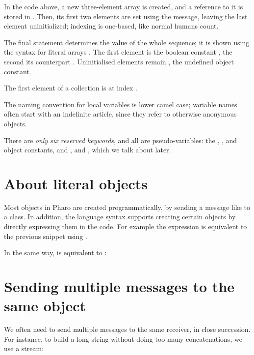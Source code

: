 \documentclass[10pt,twoside,english]{_support/latex/sbabook/sbabook}
\begin{document}
In the code above, a new three-element array is created, and a reference to it is stored in .
Then, its first two elements are set using the  message, leaving the last element uninitialized; indexing is one-based, like normal humans count.

The final statement determines the value of the whole sequence; it is shown using the syntax for literal arrays .
The first element is the boolean constant , the second its counterpart .
Uninitialised elements remain , the undefined object constant.

\begin{coffee}
The first element of a collection is at index .
\end{coffee}

\begin{coffee}
The naming convention for local variables is lower camel case; variable names often start with an indefinite article, since they refer to otherwise anonymous objects.
\end{coffee}

\begin{coffee}
There are \textit{only six reserved keywords}, and all are pseudo-variables: the , , and  object constants, and ,  and , which we talk about later.
\end{coffee}
\section{About literal objects}
Most objects in Pharo are created programmatically, by sending a message like  to a class.
In addition, the language syntax supports creating certain objects by directly expressing them in the code.
For example the expression   is equivalent to the previous snippet using .

In the same way,  is equivalent to :

\section{Sending multiple messages to the same object}
We often need to send multiple messages to the same receiver, in close succession.
For instance, to build a long string without doing too many concatenations, we use a stream:
\end{document}
